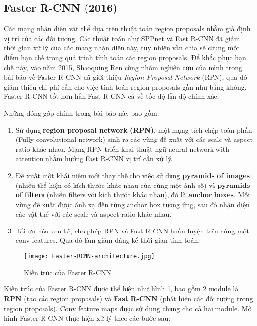 \subsection{Faster R-CNN (2016)}
Các mạng nhận diện vật thể dựa trên thuật toán region proposals nhằm giả định vị trí của các đối tượng. Các thuật toán như SPPnet \cite{he2015spatial} và Fast R-CNN \cite{Girshick_2015_ICCV} đã giảm thời gian xử lý của các mạng nhận diện này, tuy nhiên vẫn chia sẻ chung một điểm hạn chế trong quá trình tính toán các region proposals. Để khắc phục hạn chế này, vào năm 2015, Shaoquing Ren cùng nhóm nghiên cứu của mình trong bài báo về Faster R-CNN \citep{ren2015faster} đã giới thiệu \textit{Region Proposal Network} (RPN), qua đó giảm thiểu chi phí cần cho việc tính toán region proposals gần như bằng không. Faster R-CNN tốt hơn hẳn Fast R-CNN cả về tốc độ lẫn độ chính xác.

Những đóng góp chính trong bài báo này \citep{ren2015faster} bao gồm:
\begin{enumerate}
	\itemsep0em
	\item Sử dụng \textbf{region proposal network (RPN)}, một mạng tích chập toàn phần (Fully convolutional network) sinh ra các vùng đề xuất với các scale và aspect ratio khác nhau. Mạng RPN triển khai thuật ngữ neural network with attention nhằm hướng Fast R-CNN vị trí cần xử lý.
	\item Đề xuất một khái niệm mới thay thế cho việc sử dụng \textbf{pyramids of images} (nhiều thể hiện có kích thước khác nhau của cùng một ảnh số) và \textbf{pyramids of filters} (nhiều filters với kích thước khác nhau), đó là \textbf{anchor boxes}. Mỗi vùng đề xuất được ánh xạ đến từng anchor box tương ứng, sau đó nhận diện các vật thể với các scale và aspect ratio khác nhau.
	\item Tối ưu hóa xen kẽ, cho phép RPN và Fast R-CNN huấn luyện trên cùng một conv features. Qua đó làm giảm đáng kể thời gian tính toán.
\end{enumerate}



\begin{figure}[h]
	\center
	\texttt{[image: Faster-RCNN-architecture.jpg]}
	\caption{Kiến trúc của Faster R-CNN \textmd{}}
	\label{fig:faster-rcnn-architecture}
\end{figure}

Kiến trúc của Faster R-CNN được thể hiện như hình \ref{fig:faster-rcnn-architecture}, bao gồm 2 module là \textbf{RPN} (tạo các region proposals) và \textbf{Fast R-CNN} (phát hiện các đối tượng trong region proposals). Conv feature maps được sử dụng chung cho cả hai module. Mô hình Faster R-CNN thực hiện xử lý theo các bước sau:

